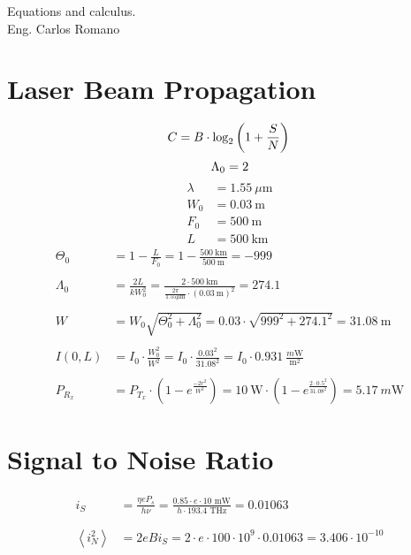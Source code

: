 \documentclass[a4paper]{article}
\begin{document}
\begin{center}
\large{Equations and calculus.}\\
\small{Eng. Carlos Romano}\\
\end{center}
\section{Laser Beam Propagation}
\begin{equation*}
C = B\cdot \textrm{log}_2\left(1+\frac{S}{N}\right) \\
\end{equation*}
\begin{equation}
\Lambda_0 = 2\\
\end{equation}
\begin{align*}
\lambda &= 1.55 \ \mu\textrm{m}\\
W_0 &= 0.03 \ \textrm{m} \\
F_0 &= 500 \ \textrm{m}\\
L &= 500 \ \textrm{km}
\end{align*}
\begin{align*}
\Theta_0 &= 1-\frac{L}{F_0} = 1 - \frac{500 \ \textrm{km}}{500\ \textrm{m} }= -999
\\
\\
\Lambda_0 &= \frac{2L}{kW_0^2}  = \frac{2\cdot 500\ \textrm{km}}{\frac{2\pi}{1.55\mu\textrm{m}}\cdot (0.03\ \textrm{m})^2} = 274.1
\\
\\
W &= W_0\sqrt{\Theta_0^2+\Lambda_0^2} = 0.03\cdot\sqrt{999^2+274.1^2} = 31.08 \ \textrm{m}
\\
\\
I(0,L) &= I_0\cdot \frac{W_0^2}{W^2} = I_0\cdot\frac{0.03^2}{31.08^2} = I_0\cdot 0.931\ \frac{m\textrm{W}}{\textrm{m}^2}
\\
\\
P_{R_x} &= P_{T_x}\cdot \left(1-e^\frac{-2r^2}{W^2}\right) = 10\ \textrm{W}\cdot \left(1-e^\frac{2\cdot0.5^2}{31.08^2}\right) = 5.17\ m\textrm{W}
\end{align*}

\section{Signal to Noise Ratio}

\begin{align*}
i_S &= \frac{\eta e P_s}{h\nu} = \frac{0.85\cdot e \cdot 10 \textrm{ mW}}{h\cdot 193.4 \textrm{ THz}} = 0.01063\\
\\
\\
\left\langle i_N^2 \right\rangle &= 2eBi_S = 2\cdot e \cdot 100\cdot 10^{9}\cdot 0.01063 = 3.406\cdot 10^{-10}
\\
\\
\end{align*}
\end{document}
